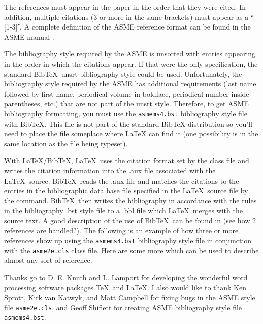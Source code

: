 \documentclass[twocolumn,10pt]{asme2e}
\begin{document}
The references must appear in the paper in the order that
they were cited.  In addition, multiple citations (3 or
more in the same brackets) must appear as a `` [1-3]''.  A
complete definition of the ASME reference format can be
found in the  ASME manual \cite{asmemanual}.

The bibliography style required by the ASME is unsorted
with entries appearing in the order in which the citations
appear. If that were the only specification, the standard
{\sc Bib}\TeX\ unsrt bibliography style could be used.
Unfortunately, the bibliography style required by the ASME
has additional requirements (last name followed by first
name, periodical volume in boldface, periodical number
inside parentheses, etc.) that are not part of the unsrt
style. Therefore, to get ASME bibliography formatting, you
must use the \verb+asmems4.bst+ bibliography style file
with {\sc Bib}\TeX. This file is not part of the standard
BibTeX distribution so you'll need to place the file
someplace where LaTeX can find it (one possibility is in
the same location as the file being typeset).

With \LaTeX/{\sc Bib}\TeX, \LaTeX\ uses the citation format
set by the class file and writes the citation information
into the .aux file associated with the \LaTeX\ source. {\sc
Bib}\TeX\ reads the .aux file and matches the citations to
the entries in the bibliographic data base file specified
in the \LaTeX\ source file by the \verb++
command. {\sc Bib}\TeX\ then writes the bibliography in
accordance with the rules in the bibliography .bst style
file to a .bbl file which \LaTeX\ merges with the source
text.  A good description of the use of {\sc Bib}\TeX\ can
be found in \cite{latex, goosens} (see how 2 references are
handled?).  The following is an example of how three or
more references \cite{latex, asmemanual,  goosens} show up
using the \verb+asmems4.bst+ bibliography style file in
conjunction with the \verb+asme2e.cls+ class file. Here are
some more \cite{art, blt, ibk, icn, ips, mts, mis, pro,
pts, trt, upd} which can be used to describe almost any
sort of reference.





\begin{acknowledgment}
Thanks go to D. E. Knuth and L. Lamport for developing the
wonderful word processing software packages \TeX\ and
\LaTeX. I also would like to thank Ken Sprott, Kirk van
Katwyk, and Matt Campbell for fixing bugs in the ASME style
file \verb+asme2e.cls+, and Geoff Shiflett for creating
ASME bibliography style file \verb+asmems4.bst+.
\end{acknowledgment}
\end{document}
